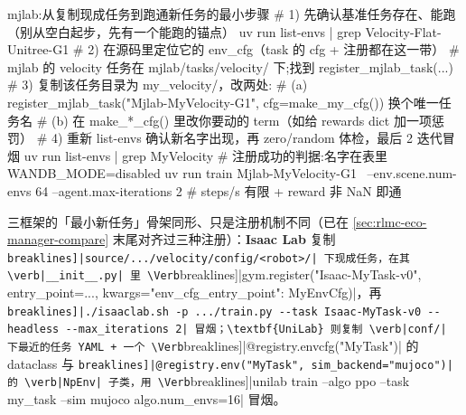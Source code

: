 \begin{codebox}[bash]{mjlab:从复制现成任务到跑通新任务的最小步骤}
# 1) 先确认基准任务存在、能跑（别从空白起步，先有一个能跑的锚点）
uv run list-envs | grep Velocity-Flat-Unitree-G1
# 2) 在源码里定位它的 env_cfg（task 的 cfg + 注册都在这一带）
#    mjlab 的 velocity 任务在 mjlab/tasks/velocity/ 下;找到 register_mjlab_task(...)
# 3) 复制该任务目录为 my_velocity/，改两处:
#    (a) register_mjlab_task("Mjlab-MyVelocity-G1", cfg=make_my_cfg()) 换个唯一任务名
#    (b) 在 make_*_cfg() 里改你要动的 term（如给 rewards dict 加一项惩罚）
# 4) 重新 list-envs 确认新名字出现，再 zero/random 体检，最后 2 迭代冒烟
uv run list-envs | grep MyVelocity                 # 注册成功的判据:名字在表里
WANDB_MODE=disabled uv run train Mjlab-MyVelocity-G1 \
    --env.scene.num-envs 64 --agent.max-iterations 2   # steps/s 有限 + reward 非 NaN 即通
\end{codebox}

三框架的「最小新任务」骨架同形、只是注册机制不同（已在 \cref{sec:rlmc-eco-manager-compare} 末尾对齐过三种注册）：\textbf{Isaac Lab} 复制 \Verb[breaklines]|source/.../velocity/config/<robot>/| 下现成任务，在其 \verb|__init__.py| 里 \Verb[breaklines]|gym.register("Isaac-MyTask-v0", entry_point=..., kwargs={"env_cfg_entry_point": MyEnvCfg})|，再 \Verb[breaklines]|./isaaclab.sh -p .../train.py --task Isaac-MyTask-v0 --headless --max_iterations 2| 冒烟；\textbf{UniLab} 则复制 \verb|conf/| 下最近的任务 YAML + 一个 \Verb[breaklines]|@registry.envcfg("MyTask")| 的 dataclass 与 \Verb[breaklines]|@registry.env("MyTask", sim_backend="mujoco")| 的 \verb|NpEnv| 子类，用 \Verb[breaklines]|unilab train --algo ppo --task my_task --sim mujoco algo.num_envs=16| 冒烟。


